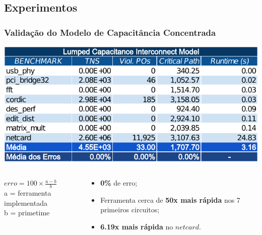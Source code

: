 \documentclass[10pt,a4paper]{beamer}
\begin{document}
		\subsection*{Experimentos}
		\begin{frame}[t]
			\frametitle{Validação do Modelo de Capacitância Concentrada}
			\vspace{-.5cm}
			\begin{center}
				\includegraphics[width=0.9\linewidth]{img/lumped_capacitance_vs_primetime.pdf} 
			\end{center}
			\vspace{-.5cm}
			\begin{columns}
				\begin{column}{0.4\textwidth}
					\begin{shaded}
						$erro = 100 \times \frac{a - b}{ b } $ \\
						\small{a = ferramenta implementada} \\
						\small{b = primetime}
					\end{shaded}
				\end{column}
				\begin{column}{0.6\textwidth}
					\begin{itemize}
						\item \textbf{0\%} de erro;
						\item Ferramenta cerca de \textbf{50x mais rápida} nos 7 primeiros circuitos;
						\item \textbf{6.19x mais rápida} no $netcard$.
					\end{itemize}
				\end{column}
			\end{columns}
			
			
		\end{frame}
		
\end{document}
